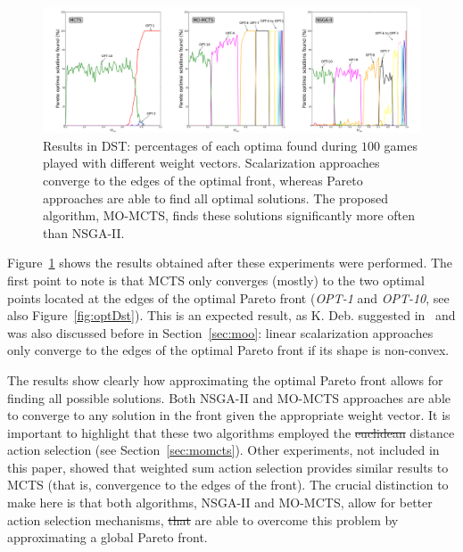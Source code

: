 \documentclass[journal]{IEEEtran}
\providecommand{\DIFaddtex}[1]{{\protect\color{blue}\uwave{#1}}} %
\providecommand{\DIFdeltex}[1]{{\protect\color{red}\sout{#1}}}                      %
\providecommand{\DIFaddbegin}{} %
\providecommand{\DIFaddend}{} %
\providecommand{\DIFdelbegin}{} %
\providecommand{\DIFdelend}{} %
\providecommand{\DIFadd}[1]{\texorpdfstring{\DIFaddtex{#1}}{#1}} %
\providecommand{\DIFdel}[1]{\texorpdfstring{\DIFdeltex{#1}}{}} %
\begin{document}
\begin{figure}[!t]
	\centering
	\includegraphics[width=2.1\columnwidth]{img/dstAll}
	\caption{Results in DST: percentages of each optima found during $100$ games played with different weight vectors. Scalarization approaches converge to the edges of the optimal front, whereas Pareto approaches are able to find all optimal solutions. The proposed algorithm, MO-MCTS, finds these solutions significantly more often than NSGA-II.}
	\label{fig:extCase}
\end{figure}

Figure~\ref{fig:extCase} shows the results obtained after these experiments were performed. The first point to note is that MCTS only converges (mostly) to the two optimal points located at the edges of the optimal Pareto front (\textit{OPT-1} and \textit{OPT-10}, see also Figure~\ref{fig:optDst}). This is an expected result, as K. Deb. suggested in~\cite{Deb2001} and was also discussed before in Section~\ref{sec:moo}: linear scalarization approaches only converge to the edges of the optimal Pareto front if its shape is non-convex.

The results show clearly how approximating the optimal Pareto front allows for finding all possible solutions. Both \DIFaddbegin \DIFadd{the }\DIFaddend NSGA-II and MO-MCTS approaches are able to converge to any solution in the front given the appropriate weight vector. It is important to highlight that these two algorithms employed the \DIFdelbegin \DIFdel{euclidean }\DIFdelend \DIFaddbegin \DIFadd{Euclidean }\DIFaddend distance action selection (see Section~\ref{sec:momcts}). Other experiments, not included in this paper, showed that weighted sum action selection provides similar results to MCTS (that is, convergence to the edges of the front). The crucial distinction to make here is that both algorithms, NSGA-II and MO-MCTS, allow for better action selection mechanisms, \DIFdelbegin \DIFdel{that }\DIFdelend \DIFaddbegin \DIFadd{which }\DIFaddend are able to overcome this problem by approximating a global Pareto front.
\end{document}
